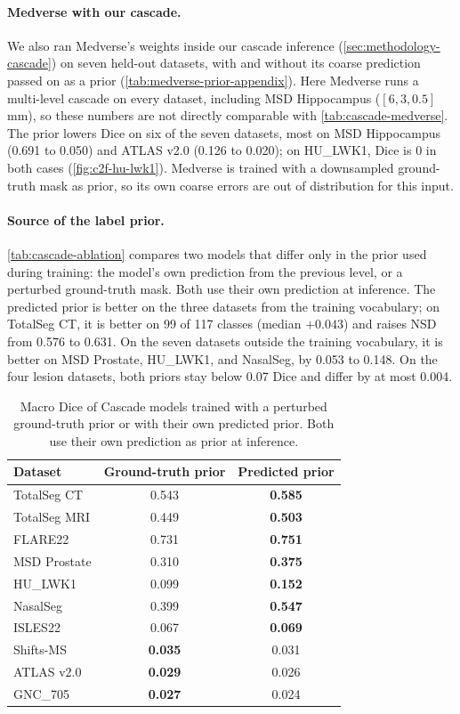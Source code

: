 \paragraph{Medverse with our cascade.}
We also ran Medverse's weights inside our cascade inference
(\autoref{sec:methodology-cascade}) on seven held-out datasets, with and
without its coarse prediction passed on as a prior
(\autoref{tab:medverse-prior-appendix}). Here Medverse runs a multi-level
cascade on every dataset, including MSD Hippocampus ($[6, 3, 0.5]$\,mm), so
these numbers are not directly comparable with \autoref{tab:cascade-medverse}.
The prior lowers Dice on six of the seven datasets, most on MSD Hippocampus
(0.691 to 0.050) and ATLAS v2.0 (0.126 to 0.020); on HU\_LWK1, Dice is 0 in
both cases (\autoref{fig:c2f-hu-lwk1}). Medverse is trained with a downsampled
ground-truth mask as prior, so its own coarse errors are out of distribution
for this input.

\paragraph{Source of the label prior.}
\autoref{tab:cascade-ablation} compares two models that differ only in the
prior used during training: the model's own prediction from the previous
level, or a perturbed ground-truth mask. Both use their own prediction at
inference. The predicted prior is better on the three datasets from the
training vocabulary; on TotalSeg CT, it is better on 99 of 117 classes
(median $+0.043$) and raises NSD from 0.576 to 0.631. On the seven datasets
outside the training vocabulary, it is better on MSD Prostate, HU\_LWK1, and
NasalSeg, by 0.053 to 0.148. On the four lesion datasets, both priors stay
below 0.07 Dice and differ by at most 0.004.

\begin{table}[t]
  \centering
  \small
  \caption{Macro Dice of Cascade models trained with a perturbed ground-truth
  prior or with their own predicted prior. Both use their own prediction as
  prior at inference.}
  \label{tab:cascade-ablation}
  \begin{tabular}{@{}lcc@{}}
    \toprule
    Dataset & Ground-truth prior & Predicted prior \\
    \midrule
    TotalSeg CT     & 0.543 & \textbf{0.585} \\
    TotalSeg MRI    & 0.449 & \textbf{0.503} \\
    FLARE22         & 0.731 & \textbf{0.751} \\
    \midrule
    MSD Prostate    & 0.310 & \textbf{0.375} \\
    HU\_LWK1        & 0.099 & \textbf{0.152} \\
    NasalSeg        & 0.399 & \textbf{0.547} \\
    \midrule
    ISLES22         & 0.067 & \textbf{0.069} \\
    Shifts-MS       & \textbf{0.035} & 0.031 \\
    ATLAS v2.0      & \textbf{0.029} & 0.026 \\
    GNC\_705        & \textbf{0.027} & 0.024 \\
    \bottomrule
  \end{tabular}
\end{table}
